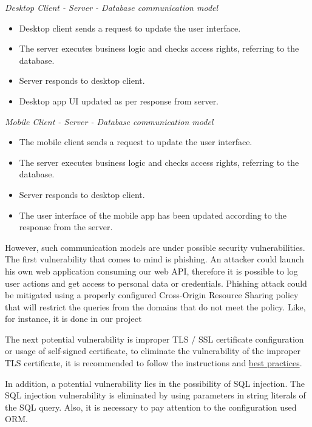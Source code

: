 \textit{Desktop Client - Server - Database communication model}
\begin{itemize}
    \item Desktop client sends a request to update the user interface.
    \item The server executes business logic and checks access rights, referring to the database.
    \item Server responds to desktop client.
    \item Desktop app UI updated as per response from server.
\end{itemize}

\textit{Mobile Client - Server - Database communication model}
\begin{itemize}
    \item The mobile client sends a request to update the user interface.
    \item The server executes business logic and checks access rights, referring to the database.
    \item Server responds to desktop client.
    \item The user interface of the mobile app has been updated according to the response from the server.
\end{itemize}

However, such communication models are under possible security vulnerabilities.
The first vulnerability that comes to mind is phishing.
An attacker could launch his own web application consuming our web API, therefore it is possible to log user actions
and get access to personal data or credentials.
Phishing attack could be mitigated using a properly configured Cross-Origin Resource Sharing policy that will restrict
the queries from the domains that do not meet the policy.
Like, for instance, it is done in our project



The next potential vulnerability is improper TLS / SSL certificate configuration or usage of self-signed certificate,
to eliminate the vulnerability of the improper TLS certificate, it is recommended to follow the instructions and
\href{https://www.ssl.com/guide/ssl-best-practices/}{best practices}.

In addition, a potential vulnerability lies in the possibility of SQL injection.
The SQL injection vulnerability is eliminated by using parameters in string literals of the SQL query.
Also, it is necessary to pay attention to the configuration used ORM\@.

